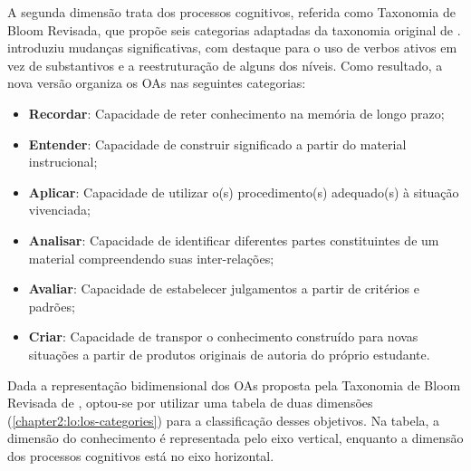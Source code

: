 A segunda dimensão trata dos processos cognitivos, referida como Taxonomia de Bloom Revisada, que propõe seis categorias adaptadas da taxonomia original de .  introduziu mudanças significativas, com destaque para o uso de verbos ativos em vez de substantivos e a reestruturação de alguns dos níveis. Como resultado, a nova versão organiza os OAs nas seguintes categorias:

\begin{itemize}
    \item \textbf{Recordar}: Capacidade de reter conhecimento na memória de longo prazo;
    \item \textbf{Entender}: Capacidade de construir significado a partir do material instrucional;
    \item \textbf{Aplicar}: Capacidade de utilizar o(s) procedimento(s) adequado(s) à situação vivenciada;
    \item \textbf{Analisar}: Capacidade de identificar diferentes partes constituintes de um material compreendendo suas inter-relações;
    \item \textbf{Avaliar}: Capacidade de estabelecer julgamentos a partir de critérios e padrões;
    \item \textbf{Criar}: Capacidade de transpor o conhecimento construído para novas situações a partir de produtos originais de autoria do próprio estudante.
\end{itemize}

Dada a representação bidimensional dos OAs proposta pela Taxonomia de Bloom Revisada de , optou-se por utilizar uma tabela de duas dimensões (\autoref{chapter2:lo:los-categories}) para a classificação desses objetivos. Na tabela, a dimensão do conhecimento é representada pelo eixo vertical, enquanto a dimensão dos processos cognitivos está no eixo horizontal. 

\begin{quadro}[htbp]
\centering
{}
\end{quadro}

